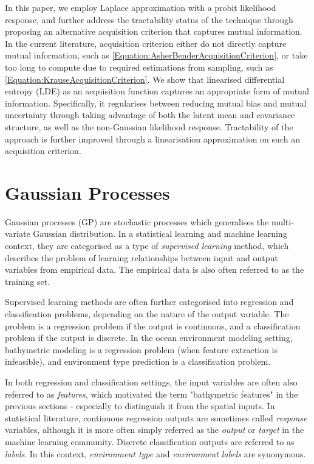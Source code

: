 		In this paper, we employ Laplace approximation with a probit likelihood response, and further address the tractability status of the technique through proposing an alternative acquisition criterion that captures mutual information. In the current literature, acquisition criterion either do not directly capture mutual information, such as \eqref{Equation:AsherBenderAcquisitionCriterion}, or take too long to compute due to required estimations from sampling, such as \eqref{Equation:KrauseAcquisitionCriterion}. We show that linearised differential entropy (LDE) as an acquisition function captures an appropriate form of mutual information. Specifically, it regularises between reducing mutual bias and mutual uncertainty through taking advantage of both the latent mean and covariance structure, as well as the non-Gaussian likelihood response. Tractability of the approach is further improved through a linearisation approximation on such an acquisition criterion.
		
	\section{Gaussian Processes}
	
		Gaussian processes (GP) are stochastic processes which generalises the multi-variate Gaussian distribution. In a statistical learning and machine learning context, they are categorised as a type of \textit{supervised learning} method, which describes the problem of learning relationships between input and output variables from empirical data. The empirical data is also often referred to as the training set.
		
		Supervised learning methods are often further categorised into regression and classification problems, depending on the nature of the output variable. The problem is a regression problem if the output is continuous, and a classification problem if the output is discrete. In the ocean environment modeling setting, bathymetric modeling is a regression problem (when feature extraction is infeasible), and environment type prediction is a classification problem.
		
		In both regression and classification settings, the input variables are often also referred to as \textit{features}, which motivated the term "bathymetric features" in the previous sections - especially to distinguish it from the spatial inputs. In statistical literature, continuous regression outputs are sometimes called \textit{response} variables, although it is more often simply referred as the \textit{output} or \textit{target} in the machine learning community. Discrete classification outputs are referred to as \textit{labels}. In this context, \textit{environment type} and \textit{environment labels} are synonymous. 
		
